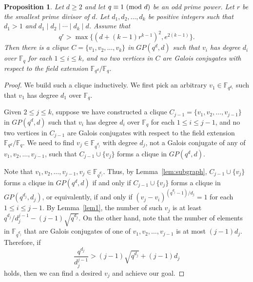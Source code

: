 \documentclass[12pt,reqno]{amsart}
\newtheorem{prop}[thm]{Proposition}
\theoremstyle{definition}
\newcommand{\F}{\mathbb{F}}
\renewcommand{\pmod}[1]{{\ifmmode\text{\rm\ (mod~$#1$)}\else\discretionary{}{}{\hbox{ }}\rm(mod~$#1$)\fi}}
\begin{document}
\begin{prop}\label{prop:predeg}
Let $d \geq 2$ and let $q \equiv 1 \pmod d$ be an odd prime power. Let $r$ be the smallest prime divisor of $d$. Let $d_1,d_2,\ldots, d_k$ be positive integers such that $d_1>1$ and $d_1\mid d_2 \mid \cdots \mid d_k \mid d$. Assume that
$$
q^r> \max \{(d+(k-1)r^{k-1})^2,e^{2(k-1)}\}.
$$
Then there is a clique $C=\{v_1,v_2, \ldots, v_k\}$ in $GP(q^d,d)$ such that $v_i$ has degree $d_i$ over $\F_q$ for each $1 \leq i \leq k$, and no two vertices in $C$ are Galois conjugates with respect to the field extension $\F_{q^d}/\F_q$.
\end{prop}
\begin{proof}
We build such a clique inductively.  We first pick an arbitrary $v_1 \in \F_{q^{d_1}}$ such that $v_1$ has degree $d_1$ over $\F_q$. 

Given $2 \leq j \leq k$, suppose we have constructed a clique $C_{j-1}=\{v_1, v_2, \ldots, v_{j-1}\}$ in $GP(q^d,d)$ such that $v_i$ has degree $d_i$ over $\F_q$ for each $1 \leq i \leq j-1$, and no two vertices in $C_{j-1}$ are Galois conjugates with respect to the field extension $\F_{q^d}/\F_q$. We need to find $v_j \in \F_{q^{d_j}}$ with degree $d_j$, not a Galois conjugate of any of $v_1, v_2, \ldots, v_{j-1}$, such that $C_{j-1} \cup \{v_j\}$ forms a clique in $GP(q^d,d)$.

Note that $v_1, v_2, \ldots, v_{j-1},v_j \in \F_{q^{d_j}}$. Thus, by Lemma~\ref{lem:subgraph}, $C_{j-1} \cup \{v_j\}$ forms a clique in $GP(q^d,d)$ if and only if 
$C_{j-1} \cup \{v_j\}$ forms a clique in $GP(q^{d_j},d_j)$, or equivalently, if and only if $(v_j-v_i)^{(q^{d_j}-1)/d_j}=1$ for each $1 \leq i \leq j-1$. By Lemma~\ref{lem1}, the number of such $v_j$ is at least $q^{d_j}/d_j^{j-1}-(j-1)\sqrt{q^{d_j}}$. On the other hand, note that the number of elements in $\F_{q^{d_j}}$ that are Galois conjugates of one of $v_1, v_2, \ldots, v_{j-1}$ is at most $(j-1)d_j$. Therefore, if 
\begin{equation}\label{eq:j}
\frac{q^{d_j}}{d_j^{j-1}}>(j-1)\sqrt{q^{d_j}}+(j-1)d_j    
\end{equation}
holds, then we can find a desired $v_j$ and achieve our goal.


\end{proof}
\end{document}
